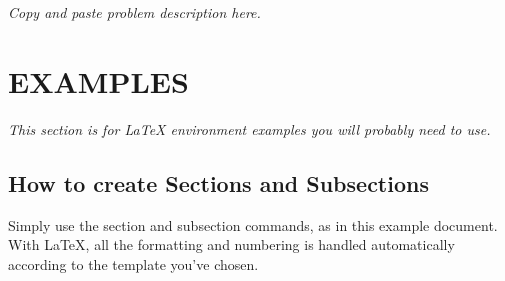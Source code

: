 \documentclass[11pt,twocolumn]{article}
\begin{document}
	
	

\section{} %
\label{sec:probleml}

\textit{Copy and paste problem description here.}

\subsection{} %
\label{ssec:p1a}

\subsubsection{} %
\label{sssec:p1ai}


\section{EXAMPLES}
\label{sec:examples}

\textit{This section is for \LaTeX{} environment examples you will probably need to use.}

\subsection{How to create Sections and Subsections}

Simply use the section and subsection commands, as in this example document. With \LaTeX{}, all the formatting and numbering is handled automatically according to the template you've chosen.
\end{document}

